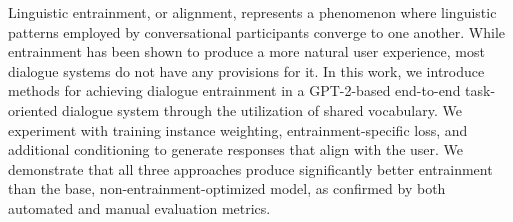 Linguistic entrainment, or alignment, represents a phenomenon where linguistic patterns employed by conversational participants converge to one another. While entrainment has been shown to produce a more natural user experience, most dialogue systems do not have any provisions for it. In this work, we introduce methods for achieving dialogue entrainment in a GPT-2-based end-to-end task-oriented dialogue system through the utilization of shared vocabulary. We experiment with training instance weighting, entrainment-specific loss, and additional conditioning to generate responses that align with the user. We demonstrate that all three approaches produce significantly better entrainment than the base, non-entrainment-optimized model, as confirmed by both automated and manual evaluation metrics.